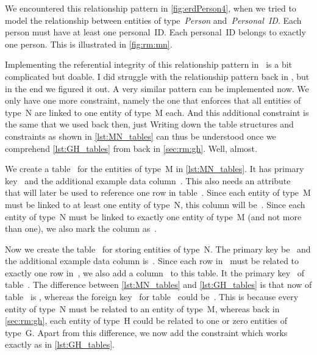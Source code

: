 We encountered this relationship pattern in \cref{fig:erdPerson4}, when we tried to model the relationship between entities of type~\emph{Person} and~\emph{Personal~ID}.
Each person must have at least one personal~ID.
Each personal~ID belongs to exactly one person.
This is illustrated in \cref{fig:rm:mn}.

Implementing the referential integrity of this relationship pattern in \sql\ is a bit complicated but doable.
I did struggle with the  relationship pattern back in , but in the end we figured it out.
A very similar pattern can be implemented now.
We only have one more constraint, namely the one that enforces that all entities of type~N are linked to one entity of type~M each.
And this additional constraint is the same that we used back then, just 
Writing down the table structures and constraints as shown in \cref{lst:MN_tables} can thus be understood once we comprehend \cref{lst:GH_tables} from back in \cref{sec:rm:gh}.
Well, almost.

We create a table~ for the entities of type~M in \cref{lst:MN_tables}.
It has primary key~ and the additional example data column~.
This also needs an attribute~ that will later be used to reference one row in table~.
Since each entity of type~M must be linked to at least one entity of type~N, this column will be~.
Since each entity of type~N must be linked to exactly one entity of type~M (and not more than one), we also mark the column as~.

Now we create the table~ for storing entities of type~N.
The primary key be~ and the additional example data column is~.
Since each row in~ must be related to exactly one row in~, we also add a column~ to this table.
It  the primary key~ of table~.
The difference between \cref{lst:MN_tables} and \cref{lst:GH_tables} is that now  of table~ is , whereas the foreign key~ for table~ could be~.
This is because every entity of type~N must be related to an entity of type~M, whereas back in \cref{sec:rm:gh}, each entity of type~H could be related to one or zero entities of type~G.
Apart from this difference, we now add the constraint  which works exactly as  in \cref{lst:GH_tables}.

